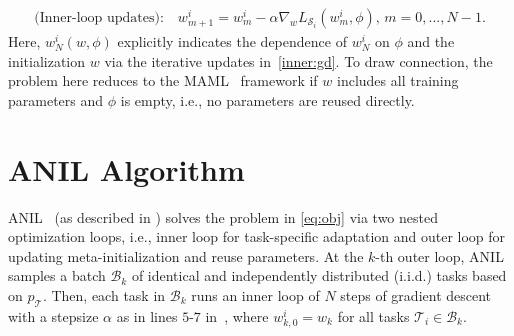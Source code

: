 \documentclass{osudissert96}
\begin{document}
\begin{align}\label{inner:gd}
\text{(Inner-loop updates):} \quad w_{m+1}^i =  w_{m}^i - \alpha \nabla_{w} L_{\mathcal{S}_i} (w_{m}^i,\phi),\, m=0,...,N-1. 
\end{align}
Here, $w^i_N(w,\phi)$ explicitly indicates the dependence of $w^i_N$ on $\phi$ and the initialization $w$ via the iterative updates in~\cref{inner:gd}. To draw connection, the problem here reduces to the  MAML~\cite{finn2017model} framework if $w$ includes all training parameters and $\phi$ is empty, i.e., no parameters are reused directly.


\section{ANIL Algorithm}\label{Algorithm}
ANIL~\cite{raghu2019rapid} (as described in ) solves the problem in \cref{eq:obj} via two nested optimization loops, i.e., inner loop for task-specific adaptation and outer loop for updating meta-initialization and reuse parameters. At the $k$-th outer loop, ANIL samples a batch $\mathcal{B}_k$ of identical and independently distributed (i.i.d.) tasks based on $p_{\mathcal{T}}$. Then, each task in $\mathcal{B}_k$ runs an inner loop of $N$ steps of gradient descent with a stepsize $\alpha$ as in lines $5$-$7$ in~, where $w_{k,0}^i =  w_k$ for all tasks $\mathcal{T}_i\in\mathcal{B}_{k}$.
\end{document}
